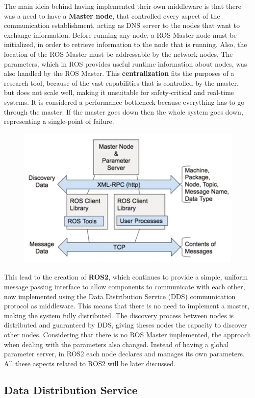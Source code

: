 The main ideia behind having implemented their own middleware is that there was a need to have a \textbf{Master node}, that controlled every aspect of the communication establishment, acting as DNS server to the nodes that want to exchange information. Before running any node, a ROS Master node must be initialized, in order to retrieve information to the node that is running. Also, the location of the ROS Master must be addressable by the network nodes. The parameters, which in ROS provides useful runtime information about nodes, was also handled by the ROS Master. This \textbf{centralization} fits the purposes of a research tool, because of the vast capabilities that is controlled by the master, but does not scale well, making it unsuitable for safety-critical and real-time systems. It is considered a performance bottleneck because everything has to go through the master. If the master goes down then the whole system goes down, representing a single-point of failure.  

\begin{figure}[H]
        \centering
         \includegraphics[width=0.5\linewidth]{images/former-ros1-architecture.png}
\end{figure}

This lead to the creation of \textbf{ROS2}, which continues to provide a simple, uniform message passing interface to allow components to communicate with each other, now implemented using the Data Distribution Service (DDS) communication protocol as middleware. This means that there is no need to implement a master, making the system fully distributed. The discovery process between nodes is distributed and guaranteed by DDS, giving theses nodes the capacity to discover other nodes. Considering that there is no ROS Master implemented, the approach when dealing with the parameters also changed. Instead of having a global parameter server, in ROS2 each node declares and manages its own parameters. All these aspects related to ROS2 will be later discussed.

\subsection{Data Distribution Service}

